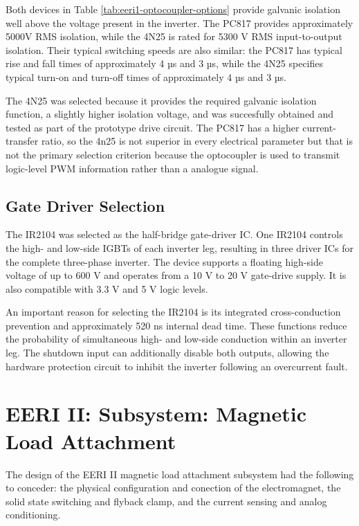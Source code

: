 Both devices in Table \ref{tab:eeri1-optocoupler-options} provide galvanic isolation well above the 
voltage present in the inverter. The PC817 provides approximately 5000V RMS isolation, while the 4N25 is
rated for 5300 V RMS input-to-output isolation. Their typical switching speeds are also similar: the PC817 
has typical rise and fall times of approximately 4 µs and 3 µs, while the 4N25 specifies typical turn-on and 
turn-off times of approximately 4 µs and 3 µs.

The 4N25 was selected because it provides the required galvanic isolation function, a slightly higher isolation
voltage, and was succesfully obtained and tested as part of the prototype drive circuit. The PC817 has a higher 
current-transfer ratio, so the 4n25 is not superior in every electrical parameter but that is not the primary selection
criterion because the optocoupler is used to transmit logic-level PWM information rather than a analogue signal.

\subsection{Gate Driver Selection}

The IR2104 was selected as the half-bridge gate-driver IC. One IR2104 controls the high- and low-side IGBTs of 
each inverter leg, resulting in three driver ICs for the complete three-phase inverter. The device supports a 
floating high-side voltage of up to 600 V and operates from a 10 V to 20 V gate-drive supply. It is also compatible
with 3.3 V and 5 V logic levels.

An important reason for selecting the IR2104 is its integrated cross-conduction prevention and approximately 
520 ns internal dead time. These functions reduce the probability of simultaneous high- and low-side conduction 
within an inverter leg. The shutdown input can additionally disable both outputs, allowing the hardware protection
circuit to inhibit the inverter following an overcurrent fault.

\section{EERI II: Subsystem: Magnetic Load Attachment}
\label{sec:eeri2-subsystem-magnetic-load-attachment}
The design of the EERI II magnetic load attachment subsystem had the following to conceder:
the physical configuration and conection of the electromagnet,
the solid state switching and flyback clamp,
and the current sensing and analog conditioning.
 
